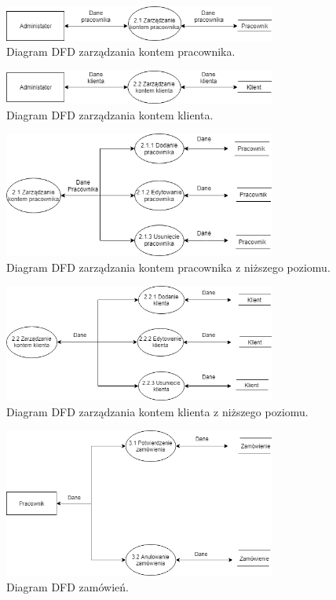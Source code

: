 \documentclass[a4paper,11pt]{article}
\begin{document}
\begin{figure}[H]
	\centering
		\includegraphics[width=0.8\textwidth]{Diagramy/DFD0-DFD22.png}
	\caption{Diagram DFD zarządzania kontem pracownika.}
\end{figure}

\begin{figure}[H]
	\centering
		\includegraphics[width=0.8\textwidth]{Diagramy/DFD0-DFD21.png}
	\caption{Diagram DFD zarządzania kontem klienta.}
\end{figure}

\begin{figure}[H]
	\centering
		\includegraphics[width=0.8\textwidth]{Diagramy/DFD0-admin-pracownik.png}
	\caption{Diagram DFD zarządzania kontem pracownika z niższego poziomu.}
\end{figure}

\begin{figure}[H]
	\centering
		\includegraphics[width=0.8\textwidth]{Diagramy/DFD0-admin-klient.png}
	\caption{Diagram DFD zarządzania kontem klienta z niższego poziomu.}
\end{figure}

\begin{figure}[H]
	\centering
		\includegraphics[width=0.8\textwidth]{Diagramy/DFD0-DFD-Zamowienie.png}
	\caption{Diagram DFD zamówień.}
\end{figure}
\end{document}
